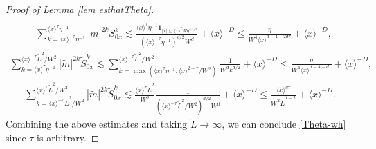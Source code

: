 \documentclass{article}
\newcommand{\1}{\mathds{1}}
\numberwithin{equation}{section}
\newcommand{\be}{\begin{equation}}
\newcommand{\ee}{\end{equation}}
\newcommand{\wh}{\widehat}
\newcommand{\wt}{\widetilde}
\renewcommand{\leq}{\leqslant}
\renewcommand{\le}{\leq}
\newcommand{\Z}{\mathbb{Z}}
\DeclareMathOperator{\OO}{O}
\theoremstyle{plain} %
\theoremstyle{remark}
\begin{document}
\begin{proof}[Proof of Lemma \ref{lem esthatTheta}]
\begin{align}
\end{align}
\begin{align} \nonumber%
&\sum_{k=\langle x\rangle^{-\tau}\eta^{-1}}^{\langle x\rangle^\tau\eta^{-1}} |m|^{2k} S^k_{0x} \lesssim  \frac{\langle x\rangle^\tau\eta^{-1}\mathbf 1_{|x|\le \langle x\rangle^\tau W \eta^{-1/2}} }{(\langle x\rangle^{-\tau}\eta^{-1})^{d/2}W^d}+ \langle x\rangle^{-D} \le \frac{\eta }{W^4\langle x\rangle^{d-4-2d\tau}}+ \langle x\rangle^{-D} ,
\end{align}
\begin{align*}
 \sum_{k=\langle x\rangle^\tau \eta^{-1}}^{ \langle x\rangle^{-\tau}\wt L^2/W^2} |\wt m|^{2k} \wt S^k_{0x}\lesssim \sum_{k=\max\left(\langle x\rangle^\tau \eta^{-1}, \langle x\rangle^{2-\tau}/W^2\right)}^{\langle x\rangle^{-\tau}\wt L^2/W^2} \frac{1}{W^dk^{d/2}} +  \langle x\rangle^{-D}  \le  \frac{\eta  }{W^4\langle x\rangle^{d-4-d\tau}} +   \langle x\rangle^{-D} ,
 \end{align*}  
\begin{align} \nonumber%
\sum_{k=\langle x\rangle^{-\tau}\wt L^2/W^2}^{\langle x\rangle^\tau \wt L^2/W^2} |\wt m|^{2k} \wt S^k_{0x} \lesssim \frac{\langle x\rangle^\tau \wt L^2}{W^2} \frac{1}{(\langle x\rangle^{-\tau}\wt L^2/W^2)^{d/2}W^d} + \langle x\rangle^{-D} \le \frac{ \langle x\rangle^{d\tau}}{W^2\wt L^{d-2} }+ \langle x\rangle^{-D}.
\end{align}
Combining the above estimates and taking $\wt L \to \infty$, we can conclude \eqref{Theta-wh} since $\tau$ is arbitrary. %


\end{proof}
\end{document}
